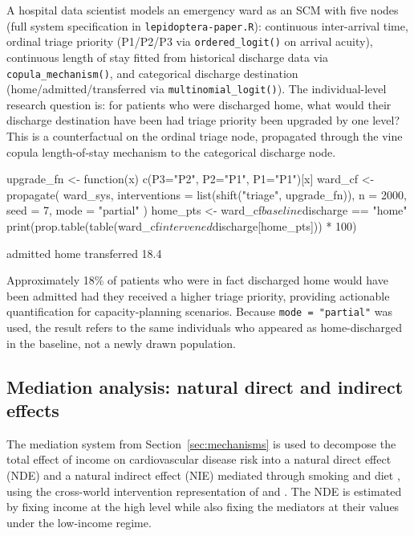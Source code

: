 \documentclass[12pt]{article}
\newcommand{\code}[1]{\texttt{#1}}
\newcommand{\fct}[1]{\texttt{#1()}}
\begin{document}
A hospital data scientist models an emergency ward as an SCM with five nodes
(full system specification in \code{lepidoptera-paper.R}):
continuous inter-arrival time, ordinal triage priority (P1/P2/P3 via
\fct{ordered\_logit} on arrival acuity), continuous length of stay fitted from
historical discharge data via \fct{copula\_mechanism}, and categorical discharge
destination (home/admitted/transferred via \fct{multinomial\_logit}). The
individual-level research question is: for patients who were discharged home, what
would their discharge destination have been had triage priority been upgraded by
one level? This is a counterfactual on the ordinal triage node, propagated through
the vine copula length-of-stay mechanism to the categorical discharge node.

\begin{CodeInput}
upgrade_fn <- function(x) c(P3="P2", P2="P1", P1="P1")[x]
ward_cf    <- propagate(
  ward_sys,
  interventions = list(shift("triage", upgrade_fn)),
  n = 2000, seed = 7, mode = "partial"
)
home_pts <- ward_cf$baseline$discharge == "home"
print(prop.table(table(ward_cf$intervened$discharge[home_pts])) * 100)
\end{CodeInput}

\begin{CodeOutput}
   admitted      home transferred
      18.4%
\end{CodeOutput}

\noindent
Approximately 18\% of patients who were in fact discharged home would have been
admitted had they received a higher triage priority, providing actionable
quantification for capacity-planning scenarios. Because \code{mode = "partial"}
was used, the result refers to the same individuals who appeared as home-discharged
in the baseline, not a newly drawn population.

\subsection{Mediation analysis: natural direct and indirect effects}

The mediation system from Section~\ref{sec:mechanisms} is used to decompose the
total effect of income on cardiovascular disease risk into a natural direct effect
(NDE) and a natural indirect effect (NIE) mediated through smoking and diet
\citep{imai2010identification, imai2013identification}, using the cross-world
intervention representation of \citet{robins1992identifiability} and
\citet{pearl2001direct}. The NDE is estimated by fixing income at the high
level while also fixing the mediators at their values under the low-income regime.
\end{document}
